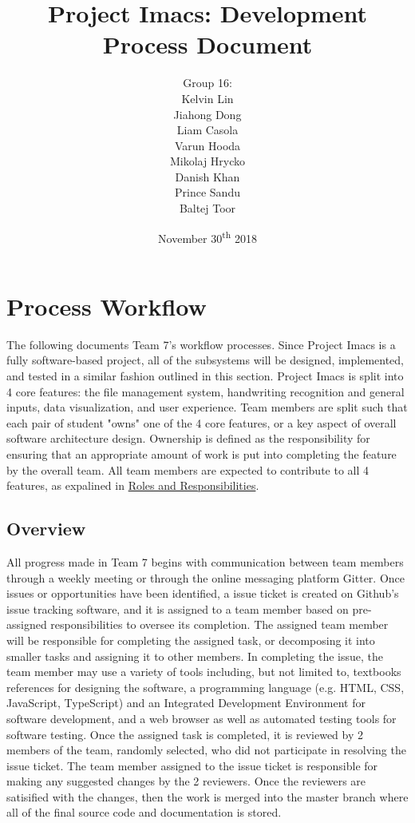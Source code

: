 \documentclass{article}
\title{Project Imacs: Development Process Document}
\author{Group 16:\\ Kelvin Lin\\ Jiahong Dong\\ Liam Casola\\ Varun Hooda\\ Mikolaj Hrycko\\ Danish Khan\\ Prince Sandu\\ Baltej Toor }
\date{November 30\textsuperscript{th} 2018}
\begin{document}
\maketitle
\newpage
\tableofcontents
\newpage

\section{Process Workflow}
\label{sec:process-workflow}
The following documents Team 7's workflow processes. Since Project Imacs is a fully software-based project, all of the subsystems will be designed, implemented, and tested in a similar fashion outlined in this section. Project Imacs is split into 4 core features: the file management system, handwriting recognition and general inputs, data visualization, and user experience. Team members are split such that each pair of student "owns" one of the 4 core features, or a key aspect of overall software architecture design. Ownership is defined as the responsibility for ensuring that an appropriate amount of work is put into completing the feature by the overall team. All team members are expected to contribute to all 4 features, as expalined in \hyperref[sec:roles-responsibilities]{Roles and Responsibilities}.

\subsection{Overview}
\label{sec:process-overview}
All progress made in Team 7 begins with communication between team members through a weekly meeting or through the online messaging platform Gitter. Once issues or opportunities have been identified, a issue ticket is created on Github's issue tracking software, and it is assigned to a team member based on pre-assigned responsibilities to oversee its completion. The assigned team member will be responsible for completing the assigned task, or decomposing it into smaller tasks and assigning it to other members. In completing the issue, the team member may use a variety of tools including, but not limited to, textbooks references for designing the software, a programming language (e.g. HTML, CSS, JavaScript, TypeScript) and an Integrated Development Environment for software development, and a web browser as well as automated testing tools for software testing. Once the assigned task is completed, it is reviewed by 2 members of the team, randomly selected, who did not participate in resolving the issue ticket. The team member assigned to the issue ticket is responsible for making any suggested changes by the 2 reviewers. Once the reviewers are satisified with the changes, then the work is merged into the master branch where all of the final source code and documentation is stored.
\end{document}
